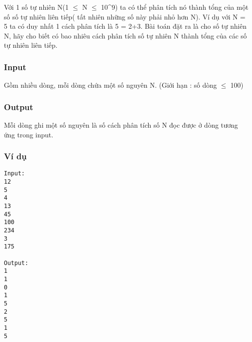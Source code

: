 



   Với 1 số tự nhiên N(1 $\le$  N  $\le$  10\textasciicircum9) ta có thể phân tích nó thành tổng của một số số tự nhiên liên tiếp( tất nhiên những số này phải nhỏ hơn N). Ví dụ với N = 5 ta có duy nhất 1 cách phân tích là 5 = 2+3.      Bài toán đặt ra là cho số tự nhiên N, hãy cho biết có bao nhiêu cách phân tích số tự nhiên N thành tổng của các số tự nhiên liên tiếp.  

\subsubsection{   Input  }

   Gồm nhiều dòng, mỗi dòng chứa một số nguyên N. (Giới hạn : số dòng  $\le$  100)  

\subsubsection{   Output  }

   Mỗi dòng ghi một số nguyên là số cách phân tích số N đọc được ở dòng tương ứng trong input.  

\subsubsection{   Ví dụ  }
\begin{verbatim}
Input:
12
5
4
13
45
100
234
3
175

Output:
1
1
0
1
5
2
5
1
5
\end{verbatim}

